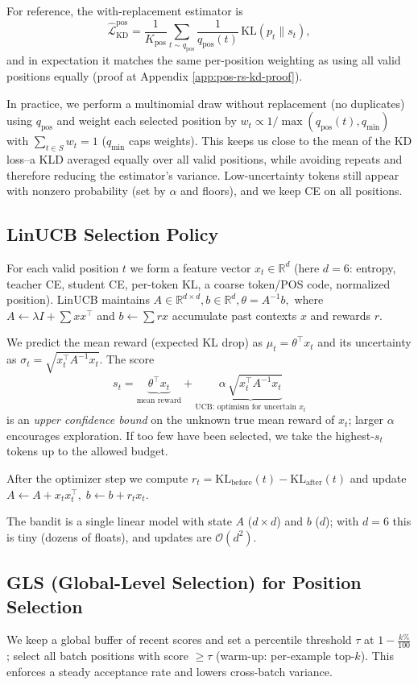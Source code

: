 \documentclass[11pt]{article}
\begin{document}
For reference, the with-replacement estimator is
\[
	\widehat{\mathcal{L}}_{\text{KD}}^{\text{pos}}
	=\frac{1}{K_{\text{pos}}}\sum_{t\sim q_{\text{pos}}}\frac{1}{q_{\text{pos}}(t)}
	\,\mathrm{KL}(p_t\|s_t),
\]
and in expectation it matches the same per-position weighting as using all valid positions equally (proof at Appendix \ref{app:pos-rs-kd-proof}).

In practice, we perform a multinomial draw without replacement (no duplicates) using $q_{\text{pos}}$ and weight each selected position by
$w_t \propto 1/\max(q_{\text{pos}}(t),q_{\min})$ with $\sum_{t\in S} w_t=1$ ($q_{\min}$ caps weights).
This keeps us close to the mean of the KD loss--a KLD averaged equally over all valid positions, while avoiding repeats and therefore reducing the estimator's variance.
Low-uncertainty tokens still appear with nonzero probability (set by $\alpha$ and floors), and we keep CE on all positions.

\subsection{LinUCB Selection Policy}
For each valid position $t$ we form a feature vector $x_t\in\mathbb{R}^d$ (here $d{=}6$: entropy, teacher CE, student CE, per-token KL, a coarse token/POS code, normalized position).
LinUCB maintains
\(
A\in\mathbb{R}^{d\times d}, b\in\mathbb{R}^d,
\theta=A^{-1}b,
\)
where $A\!\leftarrow\!\lambda I+\sum x x^\top$ and $b\!\leftarrow\!\sum r x$ accumulate past contexts $x$ and rewards $r$.

We predict the mean reward (expected KL drop) as $\mu_t=\theta^\top x_t$ and its uncertainty as
$\sigma_t=\sqrt{x_t^\top A^{-1}x_t}$. The score
\[
s_t=\underbrace{\theta^\top x_t}_{\text{mean reward}}
+\underbrace{\alpha\,\sqrt{x_t^\top A^{-1}x_t}}_{\text{UCB: optimism for uncertain }x_t}
\]
is an \emph{upper confidence bound} on the unknown true mean reward of $x_t$; larger $\alpha$ encourages exploration.
If too few have been selected, we take the highest-$s_t$ tokens up to the allowed budget.

After the optimizer step we compute $r_t=\mathrm{KL}_{\text{before}}(t)-\mathrm{KL}_{\text{after}}(t)$ and update
$A\!\leftarrow\!A+x_tx_t^\top,\; b\!\leftarrow\!b+r_tx_t$.

The bandit is a single linear model with state $A$ ($d{\times}d$) and $b$ ($d$); with $d{=}6$ this is tiny (dozens of floats), and updates are $\mathcal{O}(d^2)$.

\subsection{GLS (Global-Level Selection) for Position Selection}
We keep a global buffer of recent scores and set a percentile threshold
$\tau$ at $1-\tfrac{k\%}{100}$; select all batch positions with score $\ge\tau$ (warm-up: per-example top-$k$).
This enforces a steady acceptance rate and lowers cross-batch variance.
\end{document}
